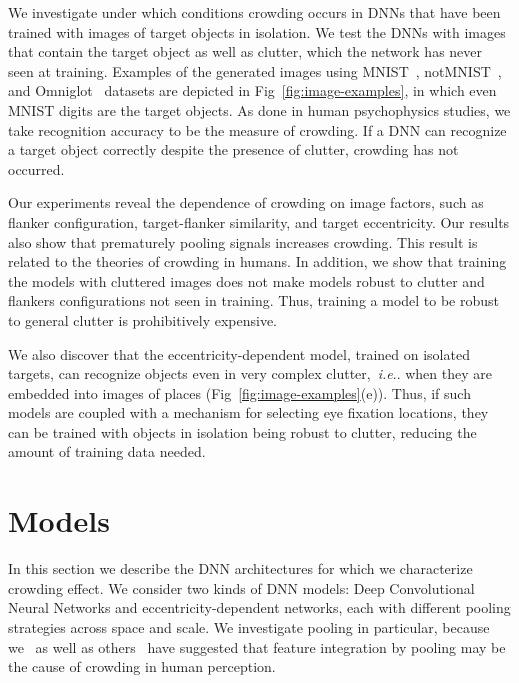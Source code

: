 \documentclass{article}
\makeatletter
\DeclareRobustCommand\onedot{\futurelet\@let@token\@onedot}
\def\@onedot{\ifx\@let@token.\else.\null\fi\xspace}
\def\ie{\emph{i.e}\onedot} \def\Ie{\emph{I.e}\onedot}
\makeatother
\begin{document}
We investigate under which conditions crowding occurs in DNNs that have been trained with images of target objects in isolation. 
We test the DNNs with images that contain the target object as well as clutter, which the network has never seen at training.  
Examples of the generated images using MNIST~\cite{lecun1998mnist}, notMNIST~\cite{notMNIST}, and Omniglot~\cite{lake2015human} datasets are depicted in Fig~\ref{fig:image-examples}, in which even MNIST digits are the target objects. 
As done in human psychophysics studies, we take recognition accuracy to be the measure of crowding. If a DNN can recognize a target object correctly despite the presence of clutter, crowding has not occurred.

Our experiments reveal the dependence of crowding on image factors, such as flanker configuration, target-flanker similarity, and target eccentricity. Our results also show that prematurely pooling signals increases crowding. This result is related to the theories of crowding in humans. 
In addition, we show that training the models with cluttered images does not make models robust to clutter and flankers configurations not seen in training.  Thus, training a model to be robust to general clutter is prohibitively expensive.

We also discover that the eccentricity-dependent model, trained on isolated targets, can recognize objects even in very complex clutter,~\ie when they are embedded into images of places (Fig~\ref{fig:image-examples}(e)).  Thus, if such models are coupled with a mechanism for selecting eye fixation locations, they can be trained with objects in isolation being robust to clutter, reducing the amount of training data needed.


\section{Models}\label{sec:models}\vspace{-0.10cm}

In this section we describe the DNN architectures for which we characterize crowding effect. We consider two kinds of DNN models: Deep Convolutional Neural Networks and eccentricity-dependent networks, each with different pooling strategies across space and scale.  We investigate pooling in particular, because we~\cite{poggio2014computational, Chen2017} as well as others~\cite{keshvari2016pooling} have suggested that feature integration by pooling may  be  the cause of crowding in human perception. 
\end{document}
